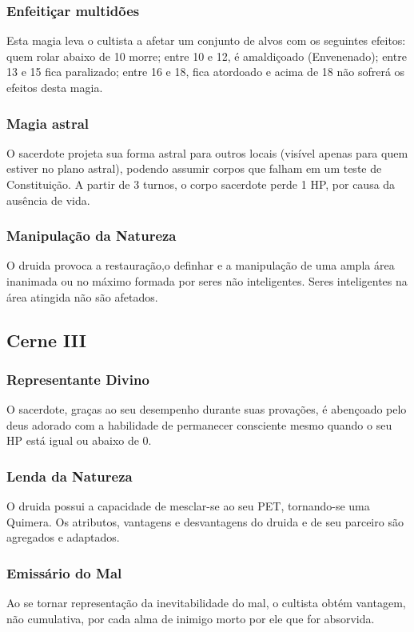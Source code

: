 \documentclass[10pt,twoside,twocolumn]{book}
\begin{document}
\subsubsection*{Enfeitiçar multidões}
Esta magia leva o cultista a afetar um conjunto de alvos com os seguintes efeitos: quem rolar abaixo de 10 morre; entre 10 e 12, é amaldiçoado (Envenenado); entre 13 e 15 fica paralizado; entre 16 e 18, fica atordoado e acima de 18 não sofrerá os efeitos desta magia.
\subsubsection*{Magia astral}
O sacerdote projeta sua forma astral para outros locais (visível apenas para quem estiver no plano astral), podendo assumir corpos que falham em um teste de Constituição. A partir de 3 turnos, o corpo sacerdote perde 1 HP, por causa da ausência de vida. 
\subsubsection*{Manipulação da Natureza}
O druida provoca a restauração,o definhar e a manipulação de uma ampla área inanimada ou no máximo formada por seres não inteligentes. Seres inteligentes na área atingida não são afetados.

\subsection*{Cerne III}
\subsubsection*{Representante Divino}
O sacerdote, graças ao seu desempenho durante suas provações, é abençoado pelo deus adorado com a habilidade de permanecer consciente mesmo quando o seu HP está igual ou abaixo de 0. 
\subsubsection*{Lenda da Natureza}
O druida possui a capacidade de mesclar-se ao seu PET, tornando-se uma Quimera. Os atributos, vantagens e desvantagens do druida e de seu parceiro são agregados e adaptados.
\subsubsection*{Emissário do Mal}
Ao se tornar representação da inevitabilidade do mal, o cultista obtém vantagem, não cumulativa, por cada alma de inimigo morto por ele que for absorvida.
\end{document}
